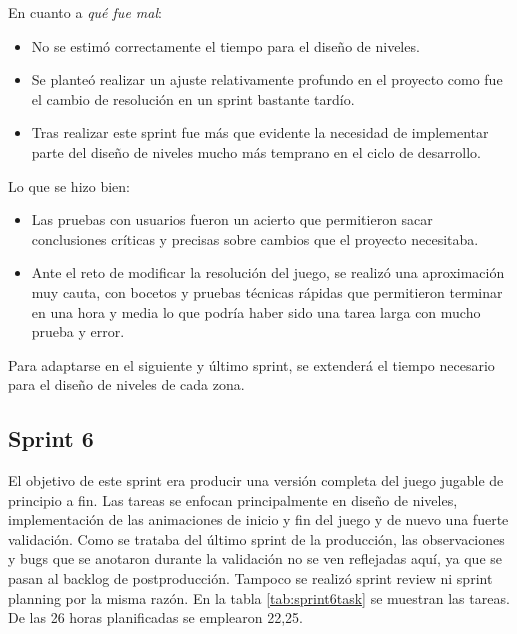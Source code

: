 En cuanto a \textit{qué fue mal}:
\begin{itemize}
    \item No se estimó correctamente el tiempo para el diseño de niveles.
    \item Se planteó realizar un ajuste relativamente profundo en el proyecto como fue el cambio de resolución en un sprint bastante tardío.
    \item Tras realizar este sprint fue más que evidente la necesidad de implementar parte del diseño de niveles mucho más temprano en el ciclo de desarrollo.
\end{itemize}

Lo que se hizo bien:
\begin{itemize}
    \item Las pruebas con usuarios fueron un acierto que permitieron sacar conclusiones críticas y precisas sobre cambios que el proyecto necesitaba.
    \item Ante el reto de modificar la resolución del juego, se realizó una aproximación muy cauta, con bocetos y pruebas técnicas rápidas que permitieron terminar en una hora y media lo que podría haber sido una tarea larga con mucho prueba y error.
\end{itemize}

Para adaptarse en el siguiente y último sprint, se extenderá el tiempo necesario para el diseño de niveles de cada zona.

\subsection{Sprint 6}

El objetivo de este sprint era producir una versión completa del juego jugable de principio a fin. Las tareas se enfocan principalmente en diseño de niveles, implementación de las animaciones de inicio y fin del juego y de nuevo una fuerte validación. Como se trataba del último sprint de la producción, las observaciones y bugs que se anotaron durante la validación no se ven reflejadas aquí, ya que se pasan al backlog de postproducción. Tampoco se realizó sprint review ni sprint planning por la misma razón. En la tabla \ref{tab:sprint6task} se muestran las tareas. De las 26 horas planificadas se emplearon 22,25.

